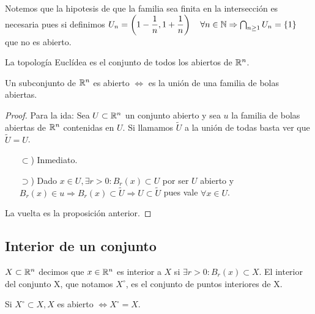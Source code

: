 Notemos que la hipotesis de que la familia sea finita en la intersección es necesaria pues si definimos \(U_n = \left(1 - \dfrac{1}{n}, 1 + \dfrac{1}{n}\right) \quad \forall n \in \mathbb{N} \Rightarrow \bigcap_{n \geq 1} U_n = \{1\}\) que no es abierto.

\begin{definition}
  La topología Euclídea es el conjunto de todos los abiertos de \(\mathbb{R}^n\).
\end{definition}

\begin{corollary}
  Un subconjunto de \(\mathbb{R}^n\) es abierto \(\iff\) es la unión de una familia de bolas abiertas.
  \begin{proof}
    Para la ida: Sea \(U \subset \mathbb{R}^n\) un conjunto abierto y sea \(u\) la familia de bolas abiertas de \(\mathbb{R}^n\) contenidas en \(U\). Si llamamos \(\tilde{U}\) a la unión de todas basta ver que \(\tilde{U} = U\). \begin{itemize}
      \item[\(\subset\))] Inmediato.
      \item[\(\supset\))] Dado \(x \in U, \exists r > 0 : B_r(x) \subset U\) por ser \(U\) abierto y \(B_r(x) \in u \Rightarrow B_r(x) \subset \tilde{U} \Rightarrow U \subset \tilde{U}\) pues vale \(\forall x \in U\).
    \end{itemize}
    La vuelta es la proposición anterior.
  \end{proof}
\end{corollary}

\subsection{Interior de un conjunto}

\begin{definition}[Interior]
  \(X \subset \mathbb{R}^n\) decimos que \(x \in \mathbb{R}^n\) es interior a \(X\) si \(\exists r > 0 : B_r(x) \subset X\). El interior del conjunto X, que notamos \(X^{\circ}\), es el conjunto de puntos interiores de X.
\end{definition}

\begin{note}
  Si \(X^{\circ} \subset X, X\) es abierto \(\iff X^{\circ} = X\).
\end{note}


